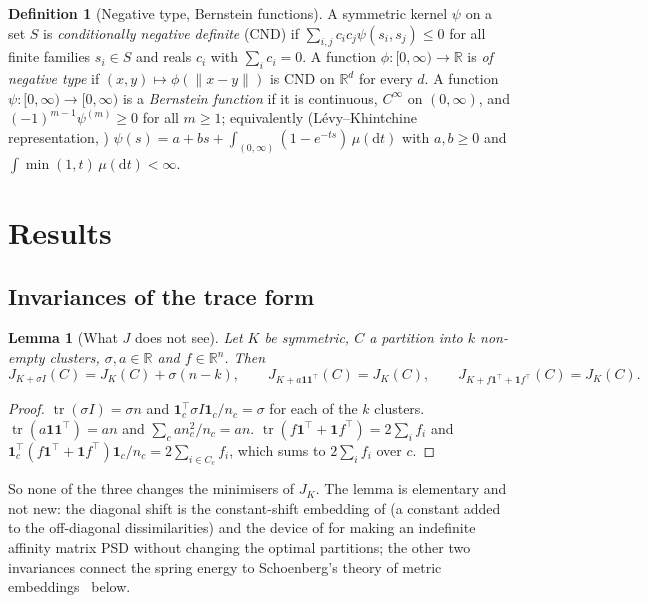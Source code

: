 \documentclass[11pt,a4paper]{article}
\theoremstyle{plain}
\newtheorem{lemma}[theorem]{Lemma}
\theoremstyle{definition}
\newtheorem{definition}[theorem]{Definition}
\theoremstyle{remark}
\newcommand{\R}{\mathbb{R}}
\newcommand{\dd}{\mathrm{d}}
\newcommand{\tr}{\operatorname{tr}}
\newcommand{\one}{\mathbf 1}
\begin{document}
\begin{definition}[Negative type, Bernstein functions]\label{def:cnd}
A symmetric kernel $\psi$ on a set $S$ is \emph{conditionally negative definite} (CND) if $\sum_{i,j}c_ic_j\psi(s_i,s_j)\le0$ for all finite families $s_i\in S$ and reals $c_i$ with $\sum_ic_i=0$. A function $\phi\colon[0,\infty)\to\R$ is \emph{of negative type} if $(x,y)\mapsto\phi(\lVert x-y\rVert)$ is CND on $\R^d$ for every $d$. A function $\psi\colon[0,\infty)\to[0,\infty)$ is a \emph{Bernstein function} if it is continuous, $C^\infty$ on $(0,\infty)$, and $(-1)^{m-1}\psi^{(m)}\ge0$ for all $m\ge1$; equivalently (L\'evy--Khintchine representation, \citealp[Thm.~3.2]{ssv2012}) $\psi(s)=a+bs+\int_{(0,\infty)}(1-e^{-ts})\,\mu(\dd t)$ with $a,b\ge0$ and $\int\min(1,t)\,\mu(\dd t)<\infty$.
\end{definition}

\section{Results}\label{sec:results}

\subsection{Invariances of the trace form}

\begin{lemma}[What $J$ does not see]\label{lem:inv}
Let $K$ be symmetric, $C$ a partition into $k$ non-empty clusters, $\sigma,a\in\R$ and $f\in\R^n$. Then
\[
J_{K+\sigma I}(C)=J_K(C)+\sigma(n-k),\qquad J_{K+a\one\one^{\!\top}}(C)=J_K(C),\qquad J_{K+f\one^{\!\top}+\one f^{\!\top}}(C)=J_K(C).
\]
\end{lemma}
\begin{proof}
$\tr(\sigma I)=\sigma n$ and $\one_c^{\!\top}\sigma I\one_c/n_c=\sigma$ for each of the $k$ clusters. $\tr(a\one\one^{\!\top})=an$ and $\sum_c a n_c^2/n_c=an$. $\tr(f\one^{\!\top}+\one f^{\!\top})=2\sum_if_i$ and $\one_c^{\!\top}(f\one^{\!\top}+\one f^{\!\top})\one_c/n_c=2\sum_{i\in C_c}f_i$, which sums to $2\sum_i f_i$ over $c$.
\end{proof}

So none of the three changes the minimisers of $J_K$. The lemma is elementary and not new: the diagonal shift is the constant-shift embedding of \citet{roth2003} (a constant added to the off-diagonal dissimilarities) and the device of \citet{dhillon2005tr,dhillon2007} for making an indefinite affinity matrix PSD without changing the optimal partitions; the other two invariances connect the spring energy to Schoenberg's theory of metric embeddings~\citep{schoenberg1935,schoenberg1938} below.
\end{document}
